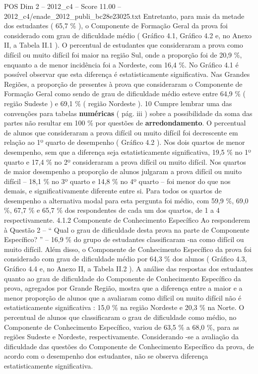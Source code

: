 \begin{textsample}{POS Dim 2 – 2012\_c4 – Score 11.00 – 2012\_c4/enade\_2012\_publi\_bc28e23025.txt}
Entretanto, para mais da metade dos estudantes ( 65,7 \% ), o Componente de Formação Geral da prova foi considerado com grau de dificuldade médio ( Gráfico 4.1, Gráfico 4.2 e, no Anexo II, a Tabela II.1 ).
O percentual de estudantes que consideraram a prova como difícil ou muito difícil foi maior na região Sul, onde a proporção foi de 20,9 \%, enquanto a de menor incidência foi a Nordeste, com 16,4 \%.
No Gráfico 4.1 é possível observar que esta diferença é estatisticamente significativa.
Nas Grandes Regiões, a proporção de presentes à prova que consideraram o Componente de Formação Geral como sendo de grau de dificuldade médio esteve entre 64,9 \% ( região Sudeste ) e 69,1 \% ( região Nordeste ). 10 Cumpre lembrar uma das convenções para tabelas \textbf{numéricas} ( pág. iii ) sobre a possibilidade da soma das partes não resultar em 100 \% por questões de \textbf{arredondamento}.
O percentual de alunos que consideraram a prova difícil ou muito difícil foi decrescente em relação ao 1º quarto de desempenho ( Gráfico 4.2 ).
Nos dois quartos de menor desempenho, sem que a diferença seja estatisticamente significativa, 19,5 \% no 1º quarto e 17,4 \% no 2º consideraram a prova difícil ou muito difícil.
Nos quartos de maior desempenho a proporção de alunos julgaram a prova difícil ou muito difícil – 18,1 \% no 3º quarto e 14,8 \% no 4º quarto – foi menor do que nos demais, e significativamente diferente entre si.
Para todos os quartos de desempenho a alternativa modal para esta pergunta foi médio, com 59,9 \%, 69,0 \%, 67,7 \% e 65,7 \% dos respondentes de cada um dos quartos, de 1 a 4 respectivamente. 4.1.2 Componente de Conhecimento Específico Ao responderem à Questão 2 – “ Qual o grau de dificuldade desta prova na parte de Componente Específico? ” – 16,9 \% do grupo de estudantes classificaram -na como difícil ou muito difícil.
Além disso, o Componente de Conhecimento Específico da prova foi considerado com grau de dificuldade médio por 64,3 \% dos alunos ( Gráfico 4.3, Gráfico 4.4 e, no Anexo II, a Tabela II.2 ).
A análise das respostas dos estudantes quanto ao grau de dificuldade do Componente de Conhecimento Específico da prova, agregados por Grande Região, mostra que a diferença entre a maior e a menor proporção de alunos que a avaliaram como difícil ou muito difícil não é estatisticamente significativa : 15,0 \% na região Nordeste e 20,3 \% na Norte.
O percentual de alunos que classificaram o grau de dificuldade como médio, no Componente de Conhecimento Específico, variou de 63,5 \% a 68,0 \%, para as regiões Sudeste e Nordeste, respectivamente.
Considerando -se a avaliação da dificuldade das questões do Componente de Conhecimento Específico da prova, de acordo com o desempenho dos estudantes, não se observa diferença estatisticamente significativa.

\end{textsample}
